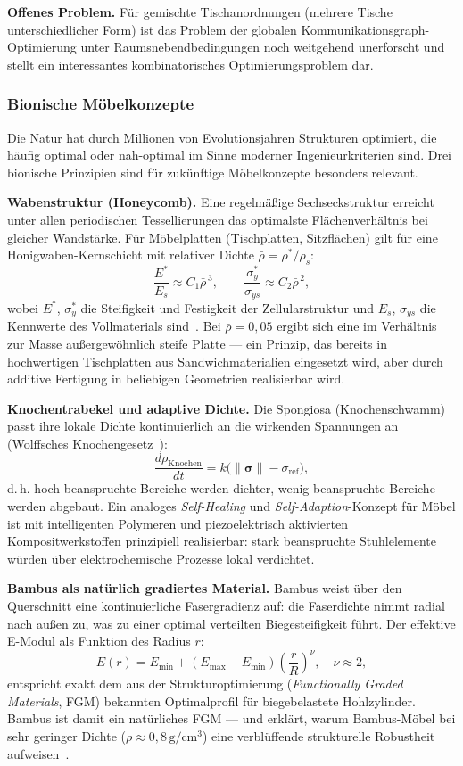 \documentclass[a4paper,12pt]{article}
\theoremstyle{definition}
\begin{document}
\textbf{Offenes Problem.}
F\"{u}r gemischte Tischanordnungen (mehrere Tische unterschiedlicher Form) ist das
Problem der globalen Kommunikationsgraph-Optimierung unter Raumsnebendbedingungen
noch weitgehend unerforscht und stellt ein interessantes kombinatorisches
Optimierungsproblem dar.

\subsubsection{Bionische M\"{o}belkonzepte}
\label{sec:bionisch}

Die Natur hat durch Millionen von Evolutionsjahren Strukturen optimiert, die
h\"{a}ufig optimal oder nah-optimal im Sinne moderner Ingenieurkriterien sind.
Drei bionische Prinzipien sind f\"{u}r zuk\"{u}nftige M\"{o}belkonzepte besonders relevant.

\textbf{Wabenstruktur (Honeycomb).}
Eine regelm\"{a}\ss{}ige Sechseckstruktur erreicht unter allen periodischen
Tessellierungen das optimalste Fl\"{a}chenverh\"{a}ltnis bei gleicher Wandst\"{a}rke.
F\"{u}r M\"{o}belplatten (Tischplatten, Sitzfl\"{a}chen) gilt f\"{u}r eine Honigwaben-Kernschicht
mit relativer Dichte $\bar\rho = \rho^*/\rho_s$:
\[
	\frac{E^*}{E_s} \approx C_1 \bar\rho^{\,3},
	\qquad
	\frac{\sigma^*_y}{\sigma_{ys}} \approx C_2 \bar\rho^{\,2},
\]
wobei $E^*$, $\sigma^*_y$ die Steifigkeit und Festigkeit der Zellularstruktur
und $E_s$, $\sigma_{ys}$ die Kennwerte des Vollmaterials sind~\cite{GibsonAshby1997}.
Bei $\bar\rho = 0{,}05$ ergibt sich eine im Verh\"{a}ltnis zur Masse
au\ss{}ergew\"{o}hnlich steife Platte --- ein Prinzip, das bereits in
hochwertigen Tischplatten aus Sandwichmaterialien eingesetzt wird,
aber durch additive Fertigung in beliebigen Geometrien realisierbar wird.

\textbf{Knochentrabekel und adaptive Dichte.}
Die Spongiosa (Knochenschwamm) passt ihre lokale Dichte kontinuierlich an
die wirkenden Spannungen an (Wolffsches Knochengesetz~\cite{Wolff1892}):
\[
	\frac{d\rho_{\mathrm{Knochen}}}{dt} = k\bigl(\|\boldsymbol{\sigma}\| - \sigma_{\mathrm{ref}}\bigr),
\]
d.\,h. hoch beanspruchte Bereiche werden dichter, wenig beanspruchte Bereiche
werden abgebaut. Ein analoges \emph{Self-Healing} und \emph{Self-Adaption}-Konzept
f\"{u}r M\"{o}bel ist mit intelligenten Polymeren und piezoelektrisch aktivierten
Kompositwerkstoffen prinzipiell realisierbar: stark beanspruchte Stuhlelemente
w\"{u}rden \"{u}ber elektrochemische Prozesse lokal verdichtet.

\textbf{Bambus als nat\"{u}rlich gradiertes Material.}
Bambus weist \"{u}ber den Querschnitt eine kontinuierliche Fasergradienz auf:
die Faserdichte nimmt radial nach au\ss{}en zu, was zu einer optimal verteilten
Biegesteifigkeit f\"{u}hrt. Der effektive E-Modul als Funktion des Radius $r$:
\[
	E(r) = E_{\min} + (E_{\max} - E_{\min})\left(\frac{r}{R}\right)^\nu, \quad \nu \approx 2,
\]
entspricht exakt dem aus der Strukturoptimierung (\emph{Functionally Graded Materials},
FGM) bekannten Optimalprofil f\"{u}r biegebelastete Hohlzylinder. Bambus ist damit
ein nat\"{u}rliches FGM --- und erkl\"{a}rt, warum Bambus-M\"{o}bel bei sehr geringer Dichte
($\rho \approx 0{,}8\,\mathrm{g/cm^3}$) eine verbl\"{u}ffende strukturelle Robustheit aufweisen~\cite{AmadaEtAl1996}.
\end{document}
